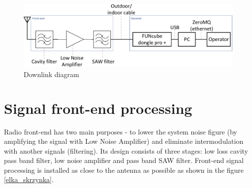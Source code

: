 \begin{figure}[H]
    \centering
    \includegraphics[width=0.8\paperwidth]{img/7/downlink_diagram.pdf}
    \caption{Downlink diagram}
    \label{downlink_diagram}
\end{figure}

\section{Signal front-end processing}
Radio front-end has two main purposes - to lower the system noise figure (by amplifying the signal with Low Noise Amplifier) and eliminate intermodulation with another signals (filtering). Its design consists of three stages: low loss cavity pass band filter, low noise amplifier and pass band SAW filter. Front-end signal processing is installed as close to the antenna as possible as shown in the figure \ref{elka_skrzynka}.

